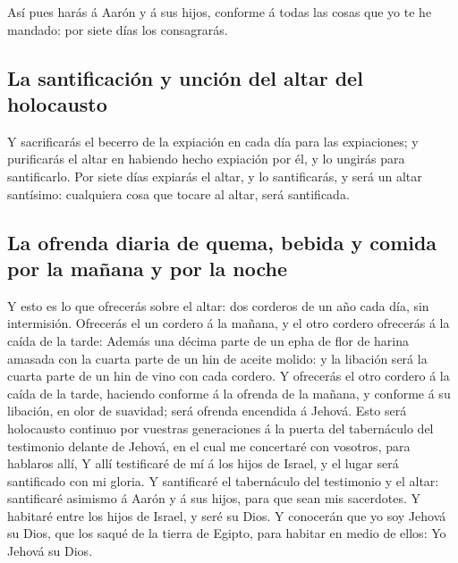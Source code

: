  Así pues harás á Aarón y á sus hijos, conforme á todas
las cosas que yo te he mandado: por siete días los consagrarás.

\hypertarget{la-santificaciuxf3n-y-unciuxf3n-del-altar-del-holocausto}{%
\subsection{La santificación y unción del altar del
holocausto}\label{la-santificaciuxf3n-y-unciuxf3n-del-altar-del-holocausto}}

 Y sacrificarás el becerro de la expiación en cada día
para las expiaciones; y purificarás el altar en habiendo hecho expiación
por él, y lo ungirás para santificarlo.  Por siete días
expiarás el altar, y lo santificarás, y será un altar santísimo:
cualquiera cosa que tocare al altar, será santificada.

\hypertarget{la-ofrenda-diaria-de-quema-bebida-y-comida-por-la-mauxf1ana-y-por-la-noche}{%
\subsection{La ofrenda diaria de quema, bebida y comida por la mañana y
por la
noche}\label{la-ofrenda-diaria-de-quema-bebida-y-comida-por-la-mauxf1ana-y-por-la-noche}}

 Y esto es lo que ofrecerás sobre el altar: dos corderos
de un año cada día, sin intermisión.  Ofrecerás el un
cordero á la mañana, y el otro cordero ofrecerás á la caída de la tarde:
 Además una décima parte de un epha de flor de harina
amasada con la cuarta parte de un hin de aceite molido: y la libación
será la cuarta parte de un hin de vino con cada cordero. 
Y ofrecerás el otro cordero á la caída de la tarde, haciendo conforme á
la ofrenda de la mañana, y conforme á su libación, en olor de suavidad;
será ofrenda encendida á Jehová.  Esto será holocausto
continuo por vuestras generaciones á la puerta del tabernáculo del
testimonio delante de Jehová, en el cual me concertaré con vosotros,
para hablaros allí,  Y allí testificaré de mí á los hijos
de Israel, y el lugar será santificado con mi gloria.  Y
santificaré el tabernáculo del testimonio y el altar: santificaré
asimismo á Aarón y á sus hijos, para que sean mis sacerdotes.
 Y habitaré entre los hijos de Israel, y seré su Dios.
 Y conocerán que yo soy Jehová su Dios, que los saqué de
la tierra de Egipto, para habitar en medio de ellos: Yo Jehová su Dios.


